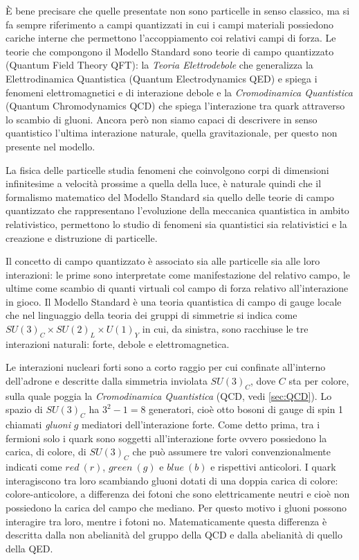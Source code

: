     È bene precisare che quelle presentate non sono particelle in senso classico, ma si fa sempre riferimento a campi quantizzati in cui i campi materiali possiedono cariche interne che permettono l'accoppiamento coi relativi campi di forza. Le teorie che compongono il Modello Standard sono teorie di campo quantizzato (Quantum Field Theory QFT): la \textit{Teoria Elettrodebole} che generalizza la Elettrodinamica Quantistica (Quantum Electrodynamics QED) e spiega i fenomeni elettromagnetici e di interazione debole e la \textit{Cromodinamica Quantistica} (Quantum Chromodynamics QCD) che spiega l'interazione tra quark attraverso lo scambio di gluoni. Ancora però non siamo capaci di descrivere in senso quantistico l'ultima interazione naturale, quella gravitazionale, per questo non presente nel modello.

    La fisica delle particelle studia fenomeni che coinvolgono corpi di dimensioni infinitesime a velocità prossime a quella della luce, è naturale quindi che il formalismo matematico del Modello Standard sia quello delle teorie di campo quantizzato che rappresentano l'evoluzione della meccanica quantistica in ambito relativistico, permettono lo studio di fenomeni sia quantistici sia relativistici e la creazione e distruzione di particelle.
    
    Il concetto di campo quantizzato è associato sia alle particelle sia alle loro interazioni: le prime sono interpretate come manifestazione del relativo campo, le ultime come scambio di quanti virtuali col campo di forza relativo all'interazione in gioco. Il Modello Standard è una teoria quantistica di campo di gauge locale che nel linguaggio della teoria dei gruppi di simmetrie si indica come $SU(3)_C \times SU(2)_L \times U(1)_Y$ in cui, da sinistra, sono racchiuse le tre interazioni naturali: forte, debole e elettromagnetica.

    Le interazioni nucleari forti sono a corto raggio per cui confinate all'interno dell'adrone e descritte dalla simmetria inviolata $SU(3)_C$, dove $C$ sta per colore, sulla quale poggia la \textit{Cromodinamica Quantistica} (QCD, vedi \ref{sec:QCD}). Lo spazio di $SU(3)_C$ ha $3^2 - 1 = 8$ generatori, cioè otto bosoni di gauge di spin 1 chiamati \textit{gluoni} $g$ mediatori dell'interazione forte. Come detto prima, tra i fermioni solo i quark sono soggetti all'interazione forte ovvero possiedono la carica, di colore, di $SU(3)_C$ che può assumere tre valori convenzionalmente indicati come $red\ (r)$, $green\ (g)$ e $blue\ (b)$ e rispettivi anticolori. I quark interagiscono tra loro scambiando gluoni dotati di una doppia carica di colore: colore-anticolore, a differenza dei fotoni che sono elettricamente neutri e cioè non possiedono la carica del campo che mediano. Per questo motivo i gluoni possono interagire tra loro, mentre i fotoni no. Matematicamente questa differenza è descritta dalla non abelianità del gruppo della QCD e dalla abelianità di quello della QED.


